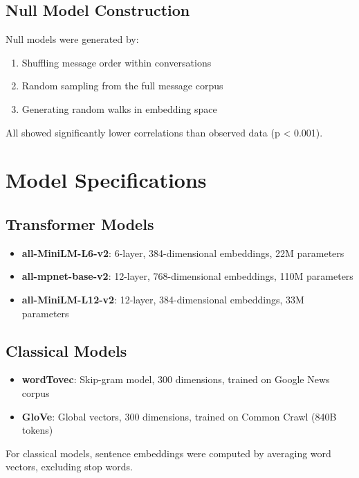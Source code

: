 \documentclass[11pt,letterpaper]{article}
\newcommand{\nullModelPValue}{0.001}
\begin{document}
\subsection{Null Model Construction}

Null models were generated by:
\begin{enumerate}
\item Shuffling message order within conversations
\item Random sampling from the full message corpus
\item Generating random walks in embedding space
\end{enumerate}

All showed significantly lower correlations than observed data (p < \nullModelPValue{}).

\section{Model Specifications}

\subsection{Transformer Models}
\begin{itemize}
\item \textbf{all-MiniLM-L6-v2}: 6-layer, 384-dimensional embeddings, 22M parameters
\item \textbf{all-mpnet-base-v2}: 12-layer, 768-dimensional embeddings, 110M parameters
\item \textbf{all-MiniLM-L12-v2}: 12-layer, 384-dimensional embeddings, 33M parameters
\end{itemize}

\subsection{Classical Models}
\begin{itemize}
\item \textbf{wordTovec}: Skip-gram model, 300 dimensions, trained on Google News corpus
\item \textbf{GloVe}: Global vectors, 300 dimensions, trained on Common Crawl (840B tokens)
\end{itemize}

For classical models, sentence embeddings were computed by averaging word vectors, excluding stop words.
\end{document}
